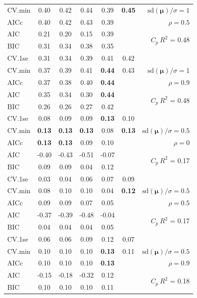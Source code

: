 \documentclass[12pt]{article}
\newcommand{\mr}[1]{\mathrm{#1}}
\newcommand{\bm}[1]{\mathbf{#1}}
\begin{document}
\begin{table}[p]
\begin{center}
\begin{tabular}{l*{5}{c}|r}
CV.min & 0.40 & 0.42 & 0.44 & 0.39 & {\bf 0.45} &  $\mr{sd}(\bm{\mu})/\sigma=1$ \\
AICc & 0.40 & 0.42 & 0.43 & 0.39 & & $\rho=0.5$ \\
AIC & 0.21 & 0.20 & 0.15 & 0.39 & & \multirow{2}{*}{$C_p ~ R^2$ = 0.48} \\
BIC & 0.31 & 0.34 & 0.38 & 0.35 & & \\
 \hline 
CV.1se & 0.31 & 0.34 & 0.39 & 0.41 & 0.42 &\\
CV.min & 0.37 & 0.39 & 0.41 & {\bf 0.44} & 0.43 &  $\mr{sd}(\bm{\mu})/\sigma=1$ \\
AICc & 0.37 & 0.38 & 0.40 & {\bf 0.44} & & $\rho=0.9$ \\
AIC & 0.35 & 0.34 & 0.30 & {\bf 0.44} & & \multirow{2}{*}{$C_p ~ R^2$ = 0.48} \\
BIC & 0.26 & 0.26 & 0.27 & 0.42 & & \\
 \hline 
CV.1se & 0.08 & 0.09 & 0.09 & {\bf 0.13} & 0.10 &\\
CV.min & {\bf 0.13} & {\bf 0.13} & {\bf 0.13} & 0.08 & {\bf 0.13} &  $\mr{sd}(\bm{\mu})/\sigma=0.5$ \\
AICc & {\bf 0.13} & {\bf 0.13} & 0.09 & 0.10 & & $\rho=0$ \\
AIC & -0.40 & -0.43 & -0.51 & -0.07 & & \multirow{2}{*}{$C_p ~ R^2$ = 0.17} \\
BIC & 0.09 & 0.09 & 0.04 & 0.12 & & \\
 \hline 
CV.1se & 0.03 & 0.04 & 0.06 & 0.07 & 0.09 &\\
CV.min & 0.08 & 0.10 & 0.10 & 0.04 & {\bf 0.12} &  $\mr{sd}(\bm{\mu})/\sigma=0.5$ \\
AICc & 0.09 & 0.09 & 0.07 & 0.05 & & $\rho=0.5$ \\
AIC & -0.37 & -0.39 & -0.48 & -0.04 & & \multirow{2}{*}{$C_p ~ R^2$ = 0.17} \\
BIC & 0.04 & 0.04 & 0.04 & 0.05 & & \\
 \hline 
CV.1se & 0.06 & 0.06 & 0.09 & 0.12 & 0.07 &\\
CV.min & 0.10 & 0.10 & 0.10 & {\bf 0.13} & 0.11 &  $\mr{sd}(\bm{\mu})/\sigma=0.5$ \\
AICc & 0.10 & 0.10 & 0.10 & {\bf 0.13} & & $\rho=0.9$ \\
AIC & -0.15 & -0.18 & -0.32 & 0.12 & & \multirow{2}{*}{$C_p ~ R^2$ = 0.18} \\
BIC & 0.10 & 0.10 & 0.10 & 0.11 & & \\
 \hline 
\end{tabular}
\end{center}
\vspace{-1cm}
\end{table}
\end{document}
